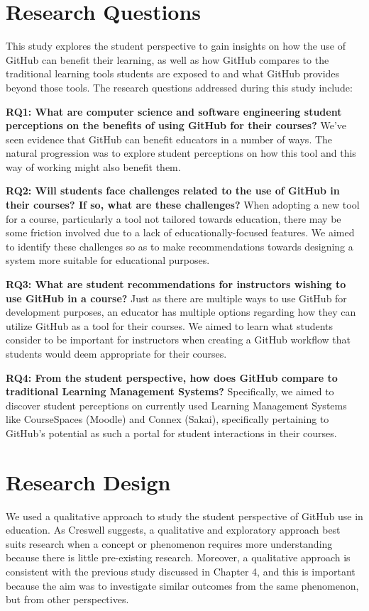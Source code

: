 \section{Research Questions}
This study explores the student perspective to gain insights on how the use of GitHub can benefit their learning, as well as how GitHub compares to the traditional learning tools students are exposed to and what GitHub provides beyond those tools. The research questions addressed during this study include:

\bigskip
\textbf{RQ1: What are computer science and software engineering student perceptions on the benefits of using GitHub for their courses?} We've seen evidence that GitHub can benefit educators in a number of ways. The natural progression was to explore student perceptions on how this tool and this way of working might also benefit them.

\bigskip
\textbf{RQ2: Will students face challenges related to the use of GitHub in their courses? If so, what are these challenges?} When adopting a new tool for a course, particularly a tool not tailored towards education, there may be some friction involved due to a lack of educationally-focused features. We aimed to identify these challenges so as to make recommendations towards designing a system more suitable for educational purposes.

\bigskip
\textbf{RQ3: What are student recommendations for instructors wishing to use GitHub in a course?} Just as there are multiple ways to use GitHub for development purposes, an educator has multiple options regarding how they can utilize GitHub as a tool for their courses. We aimed to learn what students consider to be important for instructors when creating a GitHub workflow that students would deem appropriate for their courses.

\bigskip
\textbf{RQ4: From the student perspective, how does GitHub compare to traditional Learning Management Systems?} Specifically, we aimed to discover student perceptions on currently used Learning Management Systems like CourseSpaces (Moodle) and Connex (Sakai), specifically pertaining to GitHub's potential as such a portal for student interactions in their courses.

\section{Research Design}
We used a qualitative approach to study the student perspective of GitHub use in education. As Creswell \cite{creswell2013research} suggests, a qualitative and exploratory approach best suits research when a concept or phenomenon requires more understanding because there is little pre-existing research. Moreover, a qualitative approach is consistent with the previous study discussed in Chapter 4, and this is important because the aim was to investigate similar outcomes from the same phenomenon, but from other perspectives. %

